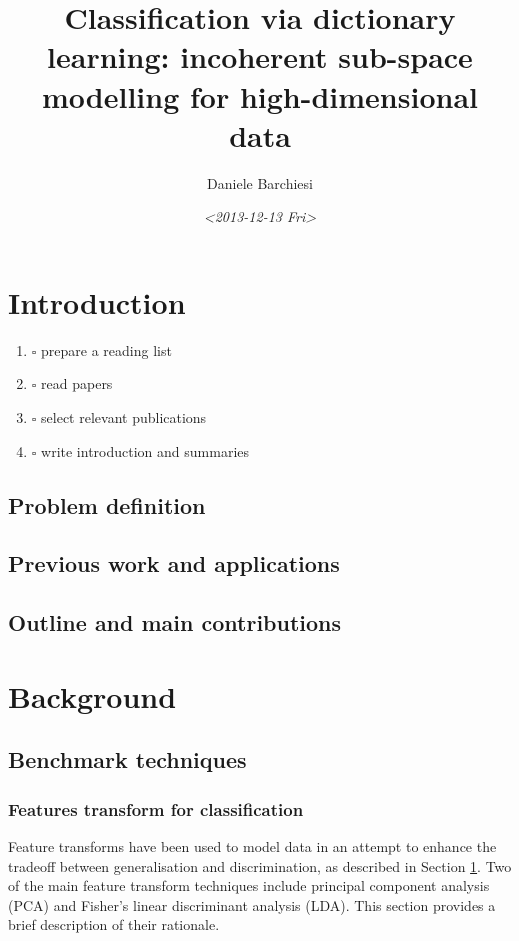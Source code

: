 \documentclass[]{article}
\author{Daniele Barchiesi}
\date{\textit{<2013-12-13 Fri>}}
\title{Classification via dictionary learning: incoherent sub-space modelling for high-dimensional data}
\begin{document}
\maketitle
\begin{abstract}

\end{abstract}

\section{Introduction}
\label{sec-1}
\begin{enumerate}
\item $\square$ prepare a reading list
\item $\square$ read papers
\item $\square$ select relevant publications
\item $\square$ write introduction and summaries
\end{enumerate}
\subsection{Problem definition}
\label{sec-1-1}

\subsection{Previous work and applications}
\label{sec-1-2}

\subsection{Outline and main contributions}
\label{sec-1-3}

\section{Background}
\label{sec-2}
\subsection{Benchmark techniques}
\label{sec-2-1}
\subsubsection{Features transform for classification}
\label{sec-2-1-1}
Feature transforms have been used to model data in an attempt to enhance the tradeoff between generalisation and discrimination, as described in Section \ref{sec-1}.
Two of the main feature transform techniques include principal component analysis (PCA) and Fisher's linear discriminant analysis (LDA). This section provides a brief description of their rationale.
\end{document}

